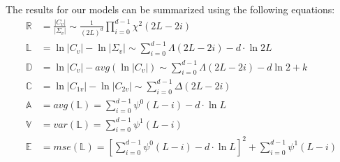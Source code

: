 \documentclass[journal]{IEEEtran}
\begin{document}
The results for our models can be summarized using the following equations:
\begin{align}
  \mathbb{R} &= \frac{|C_v|}{|\Sigma_v|} \sim \frac{1}{(2L)^d} \prod^{d-1}_{i=0} \chi^2(2L-2i) \\%
  \mathbb{L} &= \ln{|C_v|} - \ln{|\Sigma_v|} \sim \sum^{d-1}_{i=0} \Lambda(2L-2i) - d \cdot \ln{2L} \\ %
  \mathbb{D} &= \ln{|C_v|} - avg(\ln{|C_v|}) \sim \sum^{d-1}_{i=0} \Lambda(2L-2i) - d \ln{2} + k\\
  \mathbb{C} &= \ln{|C_{1v}|} - \ln{|C_{2v}|} \sim \sum^{d-1}_{i=0} \Delta(2L-2i) \\
  \mathbb{A} &= avg(\mathbb{L}) = \sum^{d-1}_{i=0} \psi^0(L-i) - d \cdot \ln{L} \\ %
  \mathbb{V} &= var(\mathbb{L}) = \sum^{d-1}_{i=0} \psi^1(L-i) \\ %
  \mathbb{E} &= mse(\mathbb{L}) =\left[ \sum^{d-1}_{i=0} \psi^0(L-i) - d \cdot \ln{L} \right]^2 +  \sum^{d-1}_{i=0} \psi^1(L-i) \label{eqn:polsar_dispersion_mse} 
\end{align}
\end{document}
